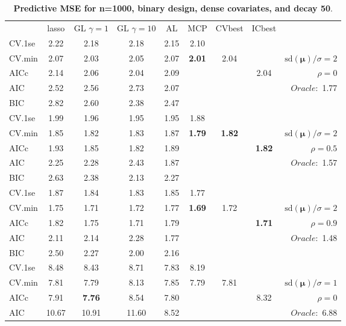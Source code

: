 \clearpage
\begin{table}\vspace{-.5cm}
\caption[l]{ { \bf Predictive MSE for n=1000, binary design, 
dense covariates, and  decay  50}.}
\vspace{-.5cm}
\footnotesize{}
\begin{center}
\begin{tabular}{l*{7}{c}|r}
 & lasso & GL $\gamma=1$ & GL $\gamma=10$ & AL & MCP  & CVbest & ICbest  \\
\cline{1-9}
CV.1se & 2.22 & 2.18 & 2.18 & 2.15 & 2.10 & & & \\
CV.min & 2.07 & 2.03 & 2.05 & 2.07 & {\bf 2.01} & 2.04 & & $\mathrm{sd}(\mathbf{\mu})/\sigma=2$ \\
AICc & 2.14 & 2.06 & 2.04 & 2.09 & & & 2.04 &  $\rho=0$ \\
AIC & 2.52 & 2.56 & 2.73 & 2.07 & & & &  \multirow{2}{*}{$Oracle: $ 1.77} \\
BIC & 2.82 & 2.60 & 2.38 & 2.47 & & & &  \\
 \hline 
CV.1se & 1.99 & 1.96 & 1.95 & 1.95 & 1.88 & & & \\
CV.min & 1.85 & 1.82 & 1.83 & 1.87 & {\bf 1.79} & {\bf 1.82} & & $\mathrm{sd}(\mathbf{\mu})/\sigma=2$ \\
AICc & 1.93 & 1.85 & 1.82 & 1.89 & & & {\bf 1.82} &  $\rho=0.5$ \\
AIC & 2.25 & 2.28 & 2.43 & 1.87 & & & &  \multirow{2}{*}{$Oracle: $ 1.57} \\
BIC & 2.63 & 2.38 & 2.13 & 2.27 & & & &  \\
 \hline 
CV.1se & 1.87 & 1.84 & 1.83 & 1.85 & 1.77 & & & \\
CV.min & 1.75 & 1.71 & 1.72 & 1.77 & {\bf 1.69} & 1.72 & & $\mathrm{sd}(\mathbf{\mu})/\sigma=2$ \\
AICc & 1.82 & 1.75 & 1.71 & 1.79 & & & {\bf 1.71} &  $\rho=0.9$ \\
AIC & 2.11 & 2.14 & 2.28 & 1.77 & & & &  \multirow{2}{*}{$Oracle: $ 1.48} \\
BIC & 2.50 & 2.27 & 2.00 & 2.16 & & & &  \\
 \hline 
CV.1se & 8.48 & 8.43 & 8.71 & 7.83 & 8.19 & & & \\
CV.min & 7.81 & 7.79 & 8.13 & 7.85 & 7.79 & 7.81 & & $\mathrm{sd}(\mathbf{\mu})/\sigma=1$ \\
AICc & 7.91 & {\bf 7.76} & 8.54 & 7.80 & & & 8.32 &  $\rho=0$ \\
AIC & 10.67 & 10.91 & 11.60 & 8.52 & & & &  \multirow{2}{*}{$Oracle: $ 6.88} \\

\end{tabular}
\end{center}
\end{table}
